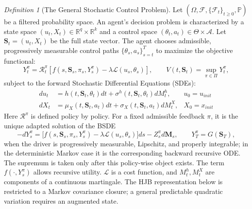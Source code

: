 \documentclass[ecta]{econsocart}
\theoremstyle{plain}
\theoremstyle{remark}
\newtheorem{definition}{Definition}
\newcommand{\R}{\mathbb{R}}
\newcommand{\statevec}{\bm{S}}
\begin{document}
\begin{definition}[The General Stochastic Control Problem]\label{eq:gsc}
Let $(\Omega, \mathcal{F}, \{\mathcal{F}_t\}_{t \ge 0}, \mathbb{P})$ be a filtered probability space. An agent's decision problem is characterized by a state space $(u_t, X_t) \in \R^q \times \R^k$ and a control space $(\theta_t, a_t) \in \Theta \times \mathcal{A}$. Let $\statevec_t = (u_t, X_t)$ be the full state vector. The agent chooses admissible, progressively measurable control paths $\{\theta_s, a_s\}_{s=t}^T$ to maximize the objective functional:
\begin{equation}
\label{eq:objective}
Y_t^{\pi}=\mathcal R_t^{\pi}\left[ f(s,\statevec_s,\pi_s,Y_s^{\pi})-\lambda\mathcal L(u_s,\theta_s)\right],
\qquad
V(t,\statevec_t)=\sup_{\pi\in\Pi}Y_t^{\pi},
\end{equation}
subject to the forward Stochastic Differential Equations (SDEs):
\begin{align}
du_t &= h(t, \statevec_t, \theta_t)dt + \sigma^h(t, \statevec_t, \theta_t) dM_t^h, & u_0 = u_{init} \label{eq:state_u} \\
dX_t &= \mu_X(t, \statevec_t, a_t)dt + \sigma_X(t, \statevec_t, a_t) dM_t^X, & X_0 = x_{init} \label{eq:state_x}
\end{align}
Here $\mathcal R^{\pi}$ is defined policy by policy. For a fixed admissible feedback $\pi$, it is the unique adapted solution of the BSDE
\begin{equation*}
-dY_s^{\pi}=\bigl[f(s,\statevec_s,\pi_s,Y_s^{\pi})-\lambda\mathcal L(u_s,\theta_s)\bigr]ds-Z_s^{\pi}d\bm M_s,\qquad Y_T^{\pi}=G(\statevec_T),
\end{equation*}
when the driver is progressively measurable, Lipschitz, and properly integrable; in the deterministic Markov case it is the corresponding backward recursive ODE. The supremum is taken only after this policy-wise object exists. The term $f(\cdot,Y_s^{\pi})$ allows recursive utility. $\mathcal{L}$ is a cost function, and $M_t^h,M_t^X$ are components of a continuous martingale. The HJB representation below is restricted to a Markov covariance closure; a general predictable quadratic variation requires an augmented state.
\end{definition}
\end{document}
